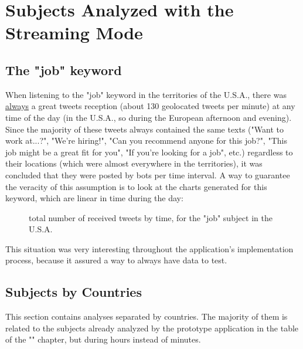 \documentclass[a4paper,11pt]{report}
\begin{document}
\section{Subjects Analyzed with the Streaming Mode}
\subsection{The "job" keyword}
When listening to the "job" keyword in the territories of the U.S.A., there was \underline{always} a great tweets reception (about 130 geolocated tweets per minute) at any time of the day (in the U.S.A., so during the European afternoon and evening). Since the majority of these tweets always contained the same texts ("Want to work at...?", "We're hiring!", "Can you recommend anyone for this job?", "This job might be a great fit for you", "If you're looking for a job", etc.) regardless to their locations (which were almost everywhere in the territories), it was concluded that they were posted by bots per time interval. A way to guarantee the veracity of this assumption is to look at the charts generated for this keyword, which are linear in time during the day:
\begin{figure}[H]
\vspace{-5pt}
\begin{center}
\vspace{-5pt}
\caption{total number of received tweets by time, for the "job" subject in the U.S.A.}
\end{center}
\end{figure}
\vspace{-10pt}

This situation was very interesting throughout the application's implementation process, because it assured a way to always have data to test.
\newpage

\subsection{Subjects by Countries}
This section contains analyses separated by countries. The majority of them is related to the subjects already analyzed by the prototype application in the table of the "" chapter, but during hours instead of minutes.
\end{document}
